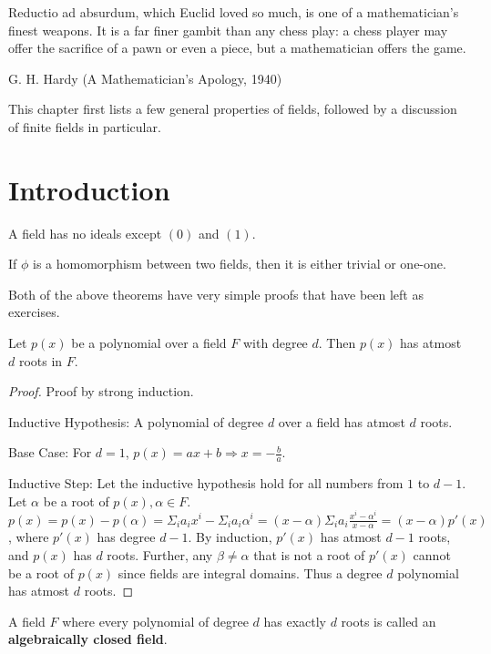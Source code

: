 \epigraph{Reductio ad absurdum, which Euclid loved so much, is one of a mathematician's finest weapons. It is a far finer gambit than any chess play: a chess player may offer the sacrifice of a pawn or even a piece, but a mathematician offers the game.}{G. H. Hardy (A Mathematician's Apology, 1940)}
This chapter first lists a few general properties of fields, followed by a discussion of finite fields in particular.
\section{Introduction}
\begin{theorem} \label{theorem:noideals}
  A field has no ideals except $(0)$ and $(1)$.
\end{theorem}
\begin{theorem} \label{theorem:nomorphisms}
  If $\phi$ is a homomorphism between two fields, then it is either trivial or one-one.
\end{theorem}
Both of the above theorems have very simple proofs that have been left as exercises.
\begin{theorem} \label{theorem:polyroots}
  Let $p(x)$ be a polynomial over a field $F$ with degree $d$.
  Then $p(x)$ has atmost $d$ roots in $F$.
\end{theorem}
\begin{proof} \label{proof:polyroots}
  Proof by strong induction.
  \par
  Inductive Hypothesis: A polynomial of degree $d$ over a field has atmost $d$ roots.
  \par
  Base Case: For $d = 1$, $p(x) = ax + b \Rightarrow x = - \frac{b}{a}$.
  \par
  Inductive Step: Let the inductive hypothesis hold for all numbers from $1$ to $d-1$.
  Let $\alpha$ be a root of $p(x), \alpha \in F$.
    $p(x) = p(x) - p(\alpha) = \Sigma_{i} a_{i} x^{i} - \Sigma_{i} a_{i} \alpha^{i} = (x - \alpha) \Sigma_{i} a_{i} \frac{x^{i} - \alpha^{i}}{x - \alpha} = (x - \alpha) p'(x)$, where $p'(x)$ has degree $d - 1$.
    By induction, $p'(x)$ has atmost $d - 1$ roots, and $p(x)$ has $d$ roots.
    Further, any $\beta \neq \alpha$ that is not a root of $p'(x)$ cannot be a root of $p(x)$ since fields are integral domains.
    Thus a degree $d$ polynomial has atmost $d$ roots.
\end{proof}
\begin{definition} \label{def:acf}
  A field $F$ where every polynomial of degree $d$ has exactly $d$ roots is called an \textbf{algebraically closed field}.
\end{definition}
